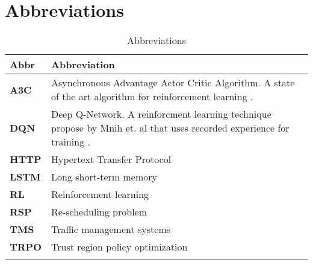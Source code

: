 \section{Abbreviations}\label{section:abkuerzungsverzeichnis}


\begin{longtable}{|m{3cm}|m{11cm}|}\hline	
	\rowcolor{gray} \textbf{Abbr}&
	Abbreviation \\ \hline

	\textbf{A3C}&
	Asynchronous Advantage Actor Critic Algorithm. A state of the art algorithm for reinforcement learning \cite{a3c}.\\ \hline

	\textbf{DQN}&
	Deep Q-Network. A reinforcment learning technique propose by Mnih et. al that uses recorded experience for training \cite{mnih2013playing}.\\ \hline

	\textbf{HTTP}&
	Hypertext Transfer Protocol \\ 
	\hline

	\textbf{LSTM}&
	Long short-term memory \\ 
	\hline

	\textbf{RL}&
	Reinforcement learning \\ 
	\hline

	\textbf{RSP}&
	Re-scheduling problem \\ 
	\hline

	\textbf{TMS}&
	Traffic management systems \\ 
	\hline

	\textbf{TRPO}&
	Trust region policy optimization \\ 
	\hline

\caption{Abbreviations}
\label{tab:abkuerzungsverzeichnis}
\end{longtable}
